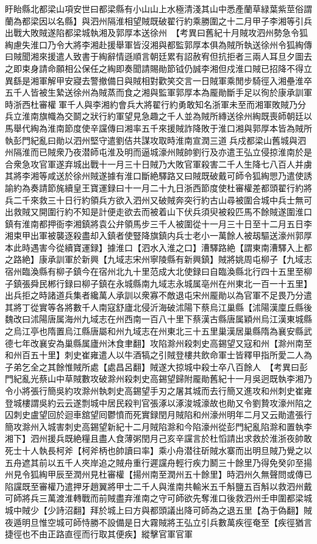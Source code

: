 盱眙縣北都梁山項安世曰都梁縣有小山山上水極清淺其山中悉產蘭草緑葉紫莖俗謂蘭為都梁因以名縣】與泗州隔淮相望賊既破翟行約乘勝圍之十二月甲子李湘等引兵出戰大敗賊遂陷都梁城執湘及郭厚本送徐州　【考異曰舊紀十月賊攻泗州勢急令狐綯慮失淮口乃令大將李湘赴援舉軍皆沒湘與都監郭厚本俱為賊所執送徐州令狐綯傳曰賊聞湘來援遣人致書于綯辭情遜順言朝廷累有詔赦宥但抗拒者三兩人耳旦夕圖去之即束身請命願相公保任之綯即奏聞請賜勛節钺仍誠李湘但戍淮口賊已招降不得立異繇是湘軍解甲安寢去警撤備日與賊相對歡笑交言一日賊軍乘閒步騎徑入湘壘淮卒五千人皆被生縶送徐州為賊蒸而食之湘與監軍郭厚本為龎勛斷手足以徇於康承訓軍時浙西杜審權軍千人與李湘約會兵大將翟行約勇敢知名浙軍未至而湘軍敗賊乃分兵立淮南旗幟為交鬬之狀行約軍望見急趣之千人並為賊所縳送徐州綯既喪師朝廷以馬舉代綯為淮南節度使辛讜傳曰湘率五千來援賊詐降敗于淮口湘與郭厚本皆為賊所執彭門紀亂曰勛以泗州堅守遣劉佶共謀攻取時淮南宣潤三道兵戍都梁山舊城與泗州隔淮而已賊衆乃夜潜師屯淮及明而逼城濠州賊帥劉行及亦遣王弘立侵掠淮南於是合衆急攻官軍遂弃城出戰十一月三十日賊乃大敗官軍殺害二千人生降七八百人并虜其將李湘等咸送於徐州賊遂據有淮口斷絶驛路又曰賊既破戴可師令狐綯愳乃遣使誘諭約為奏請節旄續皇王寶運録曰十一月二十九日浙西節度使杜審權差都頭翟行約將兵二千來救三十日行約領兵方欲入泗州又破賊奔突行約古山尋被圍合城中兵士無可出救賊又開圍行約不知是計便走欲去而被着山下伏兵須臾被殺匹馬不餘賊遂圍淮口鎮有淮南都押衙李湘鎮將袁公弁領馬步三千人被圍從十一月三十日至十二月五日李湘束甲出軍被襲逐殺盡却入鎮者使豎降旗鎮内兵士老小一萬餘人被刼驅送濠州郭厚本此時遇害今從續寶運録】據淮口【泗水入淮之口】漕驛路絶【謂東南漕驛入上都之路絶】康承訓軍於新興【九域志宋州寧陵縣有新興鎮】賊將姚周屯柳子【九域志宿州臨渙縣有柳子鎮今在宿州北九十里范成大北使録曰自臨渙縣北行四十五里至柳子鎮張舜民郴行録曰柳子鎮在永城縣南九域志永城属亳州在州東北一百一十五里】出兵拒之時諸道兵集者纔萬人承訓以衆寡不敵退屯宋州龎勛以為官軍不足畏乃分遣其將丁從實等各將數千人南寇舒廬北侵沂海破沭陽下蔡烏江巢縣【沭陽漢廩丘縣後魏改曰沭陽唐属海州九域志在州西南一百八十里下蔡漢古縣唐属穎州烏江漢東城縣之烏江亭也隋置烏江縣唐屬和州九域志在州東北三十五里巢漢居巢縣隋為襄安縣武德七年改襄安為巢縣属廬州沐食聿翻】攻陷滁州殺刺史高錫望又寇和州【滁州南至和州百五十里】刺史崔雍遣人以牛酒犒之引賊登樓共飲命軍士皆釋甲指所愛二人為子弟乞全之其餘惟賊所處【處昌呂翻】賊遂大掠城中殺士卒八百餘人　【考異曰彭門紀亂光蔡山中草賊數攻破滁州殺刺史高錫望歸附龎勛舊紀十一月吳迥既執李湘乃令小將張行簡吳約攻滁州執刺史高錫望手刃之屠其城而去行簡又進攻和州刺史崔雍登城樓謂吳約云云遂剽城中居民殺判官張涿以涿浚城濠故也勛又令劉贄攻濠州陷之囚刺史盧望回於迴車舘望囘鬱憤而死實録閏月賊陷和州濠州明年二月又云勛遣張行簡攻滁州入城害刺史高錫望新紀十二月賊陷滁和今陷濠州從彭門紀亂陷滁和置執李湘下】泗州援兵既絶糧且盡人食薄粥閏月己亥辛讜言於杜慆請出求救於淮浙夜帥敢死士十人執長柯斧【柯斧柄也帥讀曰率】乘小舟潜往斫賊水寨而出明旦賊乃覺之以五舟遮其前以五千人夾岸追之賊舟重行遲讜舟輕行疾力鬭三十餘里乃得免癸卯至揚州見令狐綯甲辰至潤州見杜審權【揚州南至潤州五十餘里】時泗州久無聲問或傳已陷讜既至審權乃遣押牙趙翼將甲士二千人與淮南共輸米五千斛鹽五百斛以救泗州戴可師將兵三萬渡淮轉戰而前賊盡弃淮南之守可師欲先奪淮口後救泗州壬申圍都梁城城中賊少【少詩沼翻】拜於城上曰方與都頭議出降可師為之退五里【為于偽翻】賊夜遁明旦惟空城可師恃勝不設備是日大霧賊將王弘立引兵數萬疾徑奄至【疾徑猶言捷徑也不由正路直徑而行取其便疾】縱擊官軍官軍